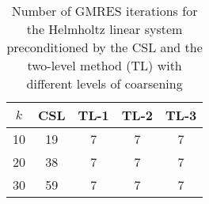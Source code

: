 \begin{table}[t]
\centering
\begin{tabular}{ccccc}
\hline
$k$ & CSL & TL-1 & TL-2 & TL-3 \\ \hline
10 & 19 & 7 & 7 & 7 \\
20 & 38 & 7 & 7 & 7 \\
30 & 59 & 7 & 7 & 7 \\
\hline
\end{tabular}
\caption{Number of GMRES iterations for the Helmholtz linear system preconditioned by the  CSL and the two-level method (TL) with different levels of coarsening}
\label{table:gmres_csl_vs_adef_coarse_eps_20}
\end{table}
